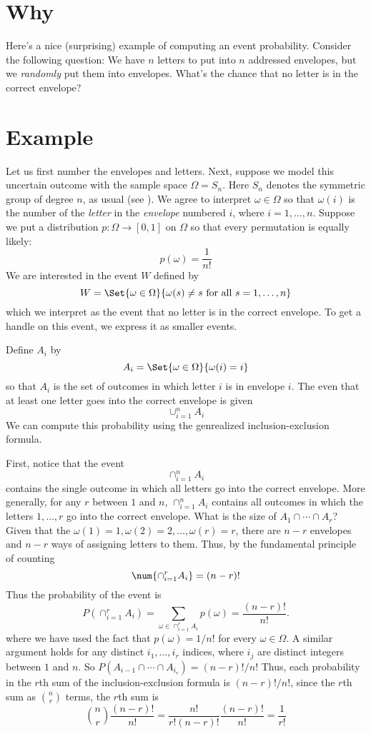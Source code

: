 
\section*{Why}

Here's a nice (surprising) example of computing an event probability.
Consider the following question:
We have $n$ letters to put into $n$ addressed envelopes, but we \textit{randomly} put them into envelopes.
What's the chance that no letter is in the correct envelope?

\section*{Example}

Let us first number the envelopes and letters.
Next, suppose we model this uncertain outcome with the sample space $\Omega  = S_n$.
Here $S_n$ denotes the symmetric group of degree $n$, as usual (see ).
We agree to interpret $\omega  \in \Omega $ so that $\omega (i)$ is the number of the \textit{letter} in the \textit{envelope} numbered $i$, where $i = 1,\dots , n$.
Suppose we put a distribution $p: \Omega  \to [0,1]$ on $\Omega $ so that every permutation is equally likely:
\[
p(\omega ) = \frac{1}{n!}
\]
We are interested in the event $W$ defined by
\[
W = \Set{\omega  \in \Omega }{\omega (s) \neq s \text{ for all } s = 1, \dots , n}
\]
which we interpret as the event that no letter is in the correct envelope.
To get a handle on this event, we express it as smaller events.

Define $A_i$ by
\[
A_i = \Set{\omega  \in \Omega }{\omega (i) = i}
\]
so that $A_i$ is the set of outcomes in which letter $i$ is in envelope $i$.
The even that at least one letter goes into the correct envelope is given
\[
\cup_{i = 1}^{n} A_i
\]
We can compute this probability using the genrealized inclusion-exclusion formula.

First, notice that the event
\[
\cap _{i = 1}^{n} A_i
\]
contains the single outcome in which all letters go into the correct envelope.
More generally, for any $r$ between $1$ and $n$, $\cap _{i = 1}^{n} A_i$ contains all outcomes in which the letters $1, \dots , r$ go into the correct envelope.
What is the size of $A_1 \cap  \cdots \cap  A_r$?
Given that the $\omega (1) = 1, \omega (2) = 2, \dots , \omega (r) = r$, there are $n-r$ envelopes and $n-r$ ways of assigning letters to them.
Thus, by the fundamental principle of counting
\[
\num{\cap _{i = 1}^{r} A_i} = (n-r)!
\]
Thus the probability of the event is
\[
P(\cap _{i = 1}^{r} A_i) = \sum_{\omega  \in \cap _{i = 1}^{r} A_i} p(\omega ) = \frac{(n-r)!}{n!}.
\]
where we have used the fact that $p(\omega ) = 1/n!$ for every $\omega  \in \Omega $.
A similar argument holds for any distinct $i_1, \dots , i_r$ indices, where $i_j$ are distinct integers between $1$ and $n$.
So $P(A_{i-1} \cap  \cdots \cap  A_{i_r}) = (n-r)!/n!$
Thus, each probability in the $r$th sum of the inclusion-exclusion formula is $(n-r)!/n!$, since the $r$th sum as ${n \choose r}$ terms, the $r$th sum is
\[
{n \choose r} \frac{(n-r)!}{n!} = \frac{n!}{r!(n-r)!}\frac{(n-r)!}{n!} = \frac{1}{r!}
\]

